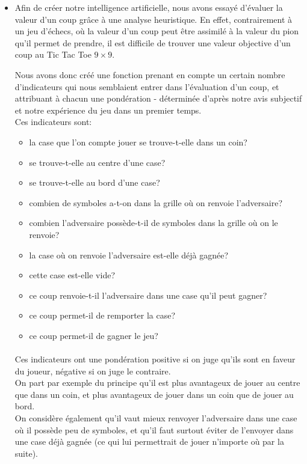 \documentclass[10pt, french]{article}
\begin{document}
\begin{itemize}
    \paragraph{}
    \item Afin de créer notre intelligence artificielle, nous avons essayé d'évaluer la valeur d'un coup grâce à une analyse heuristique. 
    En effet, contrairement à un jeu d'échecs, où la valeur d'un coup peut être assimilé à la valeur du pion qu'il permet de prendre, il est difficile de trouver une valeur objective d'un coup au Tic Tac Toe $9\times9$. \\
    \par Nous avons donc créé une fonction prenant en compte un certain nombre d'indicateurs qui nous semblaient entrer dans l'évaluation d'un coup, et attribuant à chacun une pondération - déterminée d'après notre avis subjectif et notre expérience du jeu dans un premier temps. \\
    Ces indicateurs sont: 
    \begin{itemize}
        \item la case que l'on compte jouer se trouve-t-elle dans un coin? 
        \item se trouve-t-elle au centre d'une case? 
        \item se trouve-t-elle au bord d'une case? 
        \item combien de symboles a-t-on dans la grille où on renvoie l'adversaire?
        \item combien l'adversaire possède-t-il de symboles dans la grille où on le renvoie?  
        \item la case où on renvoie l'adversaire est-elle déjà gagnée?  
        \item cette case est-elle vide? 
        \item ce coup renvoie-t-il l'adversaire dans une case qu'il peut gagner? 
        \item ce coup permet-il de remporter la case? 
        \item ce coup permet-il de gagner le jeu? 
    \end{itemize}
\paragraph{}
Ces indicateurs ont une pondération positive si on juge qu'ils sont en faveur du joueur, négative si on juge le contraire. \\
On part par exemple du principe qu'il est plus avantageux de jouer au centre que dans un coin, et plus avantageux de jouer dans un coin que de jouer au bord. \\
On considère également qu'il vaut mieux renvoyer l'adversaire dans une case où il possède peu de symboles, et qu'il faut surtout éviter de l'envoyer dans une case déjà gagnée (ce qui lui permettrait de jouer n'importe où par la suite). 

\end{itemize}
\end{document}
